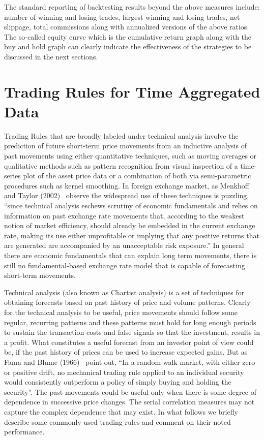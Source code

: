 The standard reporting of backtesting results beyond the above measures include: number of winning and losing trades, largest winning and losing trades, net slippage, total commissions along with annualized versions of the above ratios. The so-called equity curve which is the cumulative return graph along with the buy and hold graph can clearly indicate the effectiveness of the strategies to be discussed in the next sections. 



\section{Trading Rules for Time Aggregated Data \label{s:trading_rules_tad}}


Trading Rules that are broadly labeled under technical analysis involve the prediction of future short-term price movements from an inductive analysis of past movements using either quantitative techniques, such as moving averages or qualitative methods such as pattern recognition from visual inspection of a time-series plot of the asset price data or a combination of both via semi-parametric procedures such as kernel smoothing. In foreign exchange market, as Menkhoff and Taylor (2002)~\cite{MalTay} observe the widespread use of these techniques is puzzling, ``since technical analysis eschews scrutiny of economic fundamentals and relies on information on past exchange rate movements that, according to the weakest notion of market efficiency, should already be embedded in the current exchange rate, making its use either unprofitable or implying that any positive returns that are generated are accompanied by an unacceptable risk exposure.'' In general there are economic fundamentals that can explain long term movements, there is still no fundamental-based exchange rate model that is capable of forecasting short-term movements.


Technical analysis (also known as Chartist analysis) is a set of techniques for obtaining forecasts based on past history of price and volume patterns. Clearly for the technical analysis to be useful, price movements should follow some regular, recurring patterns and these patterns must hold for long enough periods to sustain the transaction costs and false signals so that the investment, results in a profit. What constitutes a useful forecast from an investor point of view could be, if the past history of prices can be used to increase expected gains. But as Fama and Blume (1966)~\cite{famablume} point out, ``In a random walk market, with either zero or positive drift, no mechanical trading rule applied to an individual security would consistently outperform a policy of simply buying and holding the security''. The past movements could be useful only when there is some degree of dependence in successive price changes. The serial correlation measures may not capture the complex dependence that may exist. In what follows we briefly describe some commonly used trading rules and comment on their noted performance.



